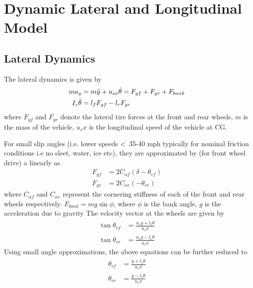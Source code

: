\section{Dynamic Lateral and Longitudinal Model} 
\subsection{Lateral Dynamics}
The lateral dynamics is given by
\begin{align}\label{eq:lat_dynamics}
    ma_y &=m\Ddot{y} + u_{sx}\dot{\theta} = F_{yf} + F_{yr} + F_{bank} \\
    I_z\Ddot{\theta} &= l_fF_{yf}-l_rF_{yr}
\end{align}
where $F_{yf}$ and $F_{yr}$ denote the lateral tire forces at the front and rear wheels, $m$ is the mass of the vehicle, $u_sx$ is the longitudinal speed of the vehicle at CG. 


For small slip angles (i.e. lower speeds <~35-40 mph typically for nominal friction conditions i.e no sleet, water, ice etc), they are approximated by (for front wheel drive) a linearly as.
\begin{align}
    F_{yf} &= 2C_{\alpha f}(\delta-\theta_{vf}) \\
    F_{yr} &= 2C_{\alpha r}(-\theta_{vr})
\end{align}
where $C_{\alpha f}$ and $C_{\alpha r}$ represent the cornering stiffness of each of the front and rear wheels respectively.
$F_{bank} = mg\sin\phi$, where $\phi$ is the bank angle, $g$ is the acceleration due to gravity
The velocity vector at the wheels are given by
\begin{align}
    \tan{\theta_{vf}} &= \frac{u_sy+l_f\dot{\theta}}{u_sx} \\
    \tan{\theta_{vr}} &= \frac{u_sy-l_r\dot{\theta}}{u_sx}
\end{align}
Using small angle approximations, the above equations can be further reduced to 
\begin{align}
    \theta_{vf} &= \frac{\dot{y}+l_f\dot{\theta}}{u_sx} \\
    \theta_{vr} &= \frac{\dot{y}-l_r\dot{\theta}}{u_sx}
\end{align}
